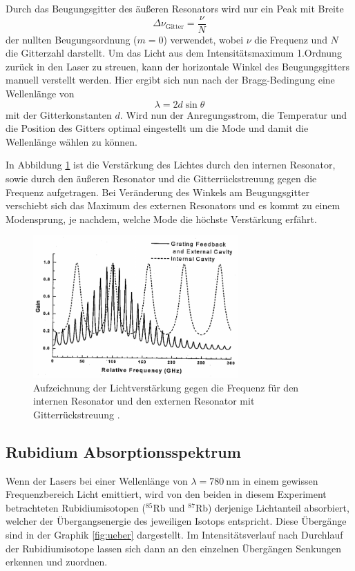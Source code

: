 Durch das Beugungsgitter des äußeren Resonators wird nur ein Peak mit Breite
\begin{equation}
  \Delta\nu_{\text{Gitter}} = \frac{\nu}{N}
\end{equation}
der nullten Beugungsordnung ($m=\num{0}$) verwendet, wobei $\nu$ die Frequenz
und $N$ die Gitterzahl darstellt. Um das Licht aus dem Intensitätsmaximum 1.Ordnung
zurück in den Laser zu streuen, kann der horizontale Winkel \theta des Beugungsgitters
manuell verstellt werden. Hier ergibt sich nun nach der Bragg-Bedingung eine
Wellenlänge von
\begin{equation}
    \lambda = 2d\sin{\theta}
\end{equation}
mit der Gitterkonstanten $d$. Wird nun der Anregungsstrom, die Temperatur und die
Position des Gitters optimal eingestellt um die Mode und damit die Wellenlänge
wählen zu können.


In Abbildung \ref{fig:gain_freq} ist die Verstärkung des Lichtes durch den internen
Resonator, sowie durch den äußeren Resonator und die Gitterrückstreuung gegen
die Frequenz aufgetragen. Bei Veränderung des Winkels am Beugungsgitter verschiebt
sich das Maximum des externen Resonators und es kommt zu einem Modensprung, je
nachdem, welche Mode die höchste Verstärkung erfährt.

\begin{figure}[htb]
  \centering
  \includegraphics[width=0.7\textwidth, angle=1, origin=c]{images/gain-freq.pdf}
  \caption{Aufzeichnung der Lichtverstärkung gegen die Frequenz für den internen
  Resonator und den externen Resonator mit Gitterrückstreuung \cite{anleitung}.}
  \label{fig:gain_freq}
\end{figure}
\newpage

\subsection{Rubidium Absorptionsspektrum}
Wenn der Lasers bei einer Wellenlänge von $\lambda = \SI{780}{\nano\meter}$ in
einem gewissen Frequenzbereich Licht emittiert, wird von den
beiden in diesem Experiment betrachteten Rubidiumisotopen ($^{85}$Rb und $^{87}$Rb)
derjenige Lichtanteil absorbiert, welcher der Übergangsenergie des jeweiligen
Isotops entspricht. Diese Übergänge sind in der Graphik \ref{fig:ueber} dargestellt.
Im Intensitätsverlauf nach Durchlauf der Rubidiumisotope lassen sich dann an den
einzelnen Übergängen Senkungen erkennen und zuordnen.

